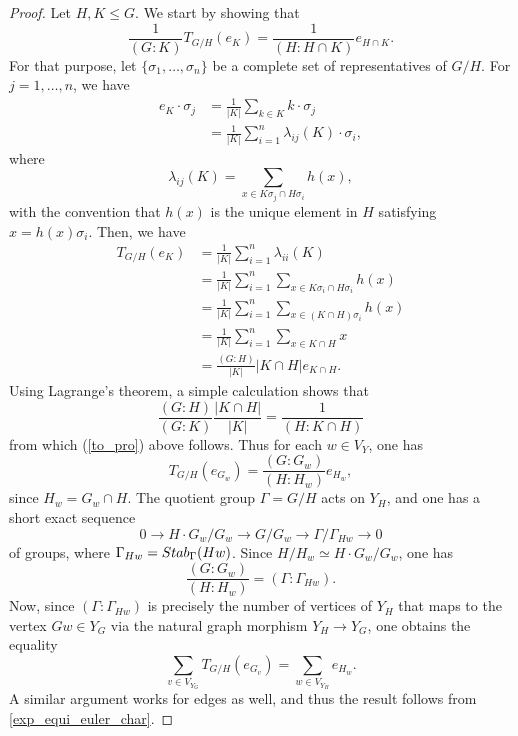\documentclass[10pt,a4paper]{amsart}
\begin{document}
\begin{proof}
Let $H,K \le G$.  We start by showing that
\begin{equation} \label{to_pro}
\frac{1}{(G:K)}T_{G/H}(e_{K}) = \frac{1}{(H:H \cap K)} e_{H \cap K}. 
\end{equation}
For that purpose, let $\{\sigma_{1},\ldots, \sigma_{n} \}$ be a complete set of representatives of $G/H$.  For $j=1,\ldots,n$, we have
\begin{equation*} 
\begin{aligned}
e_{K} \cdot \sigma_{j} &= \frac{1}{|K|} \sum_{k \in K} k \cdot \sigma_{j} \\
&= \frac{1}{|K|} \sum_{i=1}^{n} \lambda_{ij}(K) \cdot \sigma_{i},
\end{aligned}
\end{equation*}
where
$$\lambda_{ij}(K) = \sum_{x \in K\sigma_{j} \cap H \sigma_{i}} h(x), $$
with the convention that $h(x)$ is the unique element in $H$ satisfying $x = h(x)\sigma_{i}$.  Then, we have
\begin{equation*}
\begin{aligned}
T_{G/H}(e_{K}) &= \frac{1}{|K|} \sum_{i=1}^{n} \lambda_{ii}(K) \\
&= \frac{1}{|K|} \sum_{i=1}^{n} \sum_{x \in K\sigma_{i} \cap H\sigma_{i}} h(x) \\
&= \frac{1}{|K|} \sum_{i=1}^{n} \sum_{x \in (K\cap H )\sigma_{i}}h(x) \\
&= \frac{1}{|K|} \sum_{i=1}^{n} \sum_{x \in K \cap H} x \\
&= \frac{(G:H)}{|K|} |K \cap H| e_{K \cap H}.
\end{aligned}
\end{equation*}
Using Lagrange's theorem, a simple calculation shows that
$$\frac{(G:H)}{(G:K)}\frac{|K \cap H|}{|K|} = \frac{1}{(H:K\cap H)} $$
from which (\ref{to_pro}) above follows.  Thus for each $w \in V_{Y}$, one has
$$T_{G/H}(e_{G_{w}}) = \frac{(G:G_{w})}{(H:H_{w})} e_{H_{w}}, $$
since $H_{w} = G_{w} \cap H$.  The quotient group $\Gamma = G/H$ acts on $Y_{H}$, and one has a short exact sequence
\begin{equation}
0 \rightarrow H \cdot G_{w}/G_{w} \rightarrow G/G_{w} \rightarrow \Gamma/\Gamma_{Hw} \rightarrow 0
\end{equation}
of groups, where $\Gamma_{Hw} = {\rm Stab}_{\Gamma}(Hw)$.  Since $H/H_{w} \simeq H \cdot G_{w}/G_{w}$, one has
$$\frac{(G:G_{w})}{(H:H_{w})} = (\Gamma:\Gamma_{Hw}). $$
Now, since $(\Gamma:\Gamma_{Hw})$ is precisely the number of vertices of $Y_{H}$ that maps to the vertex $Gw \in Y_{G}$ via the natural graph morphism $Y_{H} \rightarrow Y_{G}$, one obtains the equality
$$\sum_{v \in V_{Y_G}}T_{G/H}(e_{G_{v}}) = \sum_{w \in V_{Y_{H}}}e_{H_{w}}. $$
A similar argument works for edges as well, and thus the result follows from \cref{exp_equi_euler_char}. 
\end{proof}
\end{document}
